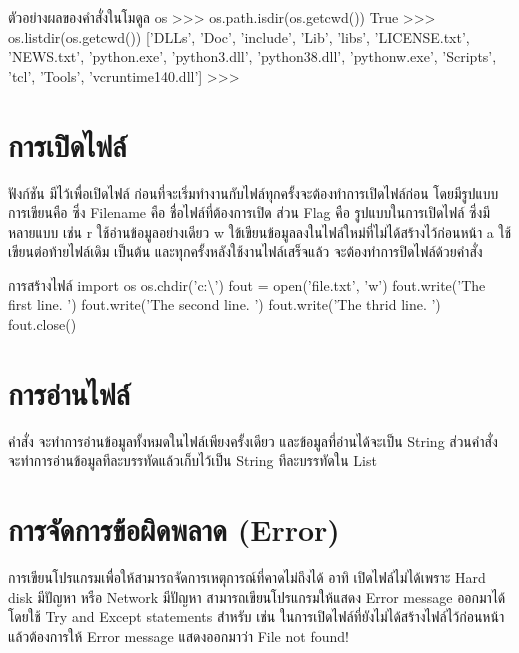 \begin{codelist}{ตัวอย่างผลของคำสั่งในโมดูล os}{}
>>> os.path.isdir(os.getcwd())
True
>>> os.listdir(os.getcwd())
['DLLs', 'Doc', 'include', 'Lib', 'libs', 'LICENSE.txt', 'NEWS.txt', 'python.exe', 'python3.dll', 'python38.dll', 'pythonw.exe', 'Scripts', 'tcl', 'Tools', 'vcruntime140.dll']
>>>
\end{codelist}


\section{การเปิดไฟล์}

ฟังก์ชัน มีไว้เพื่อเปิดไฟล์ ก่อนที่จะเริ่มทำงานกับไฟล์ทุกครั้งจะต้องทำการเปิดไฟล์ก่อน โดยมีรูปแบบการเขียนคือ  ซึ่ง Filename คือ ชื่อไฟล์ที่ต้องการเปิด ส่วน Flag คือ รูปแบบในการเปิดไฟล์ ซึ่งมีหลายแบบ เช่น r ใช้อ่านข้อมูลอย่างเดียว w ใข้เขียนข้อมูลลงในไฟล์ใหม่ที่ไม่ได้สร้างไว้ก่อนหน้า a ใช้เขียนต่อท้ายไฟล์เดิม เป็นต้น และทุกครั้งหลังใช้งานไฟล์เสร็จแล้ว จะต้องทำการปิดไฟล์ด้วยคำสั่ง 

\begin{codelist}{การสร้างไฟล์}{}
import os
os.chdir('c:\textbackslash\Users\janta\Desktop')
fout = open('file.txt', 'w')
fout.write('The first line. \n')
fout.write('The second line. \n')
fout.write('The thrid line. \n')
fout.close()
\end{codelist}


\section{การอ่านไฟล์}

คำสั่ง  จะทำการอ่านข้อมูลทั้งหมดในไฟล์เพียงครั้งเดียว และข้อมูลที่อ่านได้จะเป็น String ส่วนคำสั่ง  จะทำการอ่านข้อมูลทีละบรรทัดแล้วเก็บไว้เป็น String ทีละบรรทัดใน List

\section{การจัดการข้อผิดพลาด (Error)}

การเขียนโปรแกรมเพื่อให้สามารถจัดการเหตุการณ์ที่คาดไม่ถึงได้ อาทิ เปิดไฟล์ไม่ได้เพราะ Hard disk มีปัญหา หรือ Network มีปัญหา สามารถเขียนโปรแกรมให้แสดง Error message ออกมาได้ โดยใช้ Try and Except statements สำหรับ  เช่น ในการเปิดไฟล์ที่ยังไม่ได้สร้างไฟล์ไว้ก่อนหน้า แล้วต้องการให้ Error message แสดงออกมาว่า  File not found!

